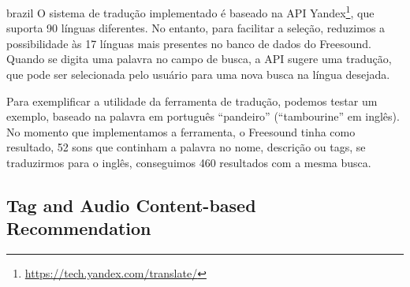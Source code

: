 \begin{otherlanguage*}{brazil}
O sistema de tradução implementado é baseado na API Yandex\footnote{\url{https://tech.yandex.com/translate/}}, que suporta 90 línguas diferentes. No entanto, para facilitar a seleção, reduzimos a possibilidade às 17 línguas mais presentes no banco de dados do Freesound. Quando se digita uma palavra no campo de busca, a API sugere uma tradução, que pode ser selecionada pelo usuário para uma nova busca na língua desejada.

Para exemplificar a utilidade da ferramenta de tradução, podemos testar um exemplo, baseado na palavra em português ``pandeiro'' (``tambourine'' em inglês). No momento que implementamos a ferramenta, o Freesound tinha como resultado, 52 sons que continham a palavra no nome, descrição ou tags, se traduzirmos para o inglês, conseguimos 460 resultados com a mesma busca.





\subsection{Tag and Audio Content-based Recommendation}


\end{otherlanguage*}
